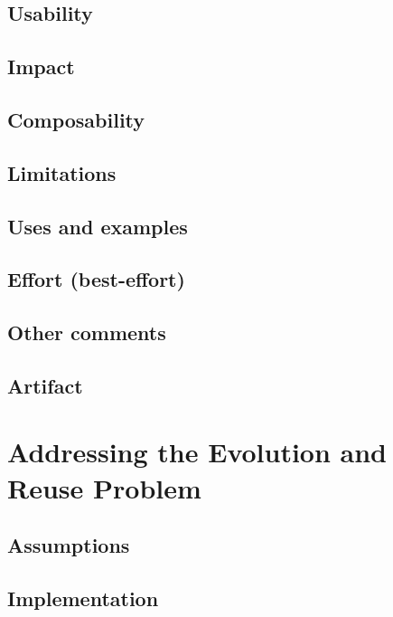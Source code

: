 \documentclass[preprint,numbers,10pt]{sigplanconf}
\begin{document}
\subsection{Usability}

\subsection{Impact}

\subsection{Composability}

\subsection{Limitations}

\subsection{Uses and examples}

\subsection{Effort (best-effort)}

\subsection{Other comments}

\subsection{Artifact}

%
%

\section{Addressing the Evolution and Reuse Problem}

\subsection{Assumptions}

\subsection{Implementation}
\end{document}
